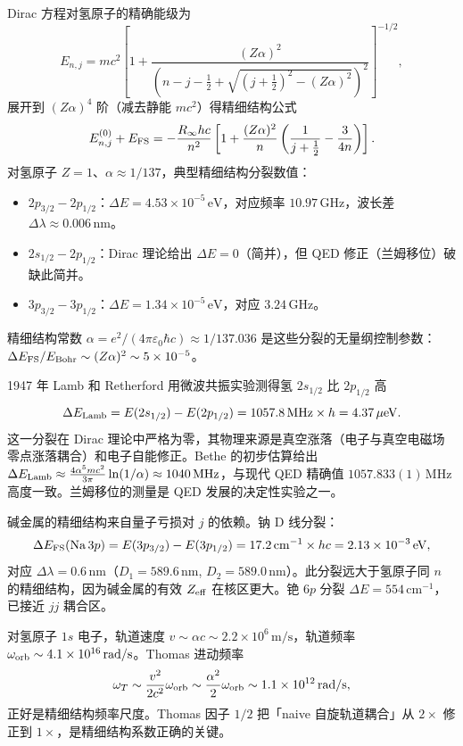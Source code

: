 Dirac 方程对氢原子的精确能级为
\[
 E_{n,j}=mc^2\left[1+\frac{(Z\alpha)^2}{\left(n-j-\frac12+\sqrt{(j+\frac12)^2-(Z\alpha)^2}\right)^2}\right]^{-1/2},
\]
展开到 $(Z\alpha)^4$ 阶（减去静能 $mc^2$）得精细结构公式
\[
 E_{n,j}^{(0)}+E_{\rm FS}
 =-\frac{R_\infty hc}{n^2}\left[1+\frac{(Z\alpha)^2}{n}\left(\frac1{j+\frac12}-\frac{3}{4n}\right)\right].
\]
对氢原子 $Z=1$、$\alpha\approx1/137$，典型精细结构分裂数值：
\begin{itemize}
 \item $2p_{3/2}-2p_{1/2}$：$\Delta E=4.53\times10^{-5}\,\mathrm{eV}$，对应频率 $10.97\,\mathrm{GHz}$，波长差 $\Delta\lambda\approx0.006\,\mathrm{nm}$。
 \item $2s_{1/2}-2p_{1/2}$：Dirac 理论给出 $\Delta E=0$（简并），但 QED 修正（兰姆移位）破缺此简并。
 \item $3p_{3/2}-3p_{1/2}$：$\Delta E=1.34\times10^{-5}\,\mathrm{eV}$，对应 $3.24\,\mathrm{GHz}$。
\end{itemize}
精细结构常数 $\alpha=e^2/(4\pi\varepsilon_0\hbar c)\approx1/137.036$ 是这些分裂的无量纲控制参数：$\Delta E_{\rm FS}/E_{\rm Bohr}\sim(Z\alpha)^2\sim5\times10^{-5}$。

1947 年 Lamb 和 Retherford 用微波共振实验测得氢 $2s_{1/2}$ 比 $2p_{1/2}$ 高
\[
 \Delta E_{\rm Lamb}=E(2s_{1/2})-E(2p_{1/2})=1057.8\,\mathrm{MHz}\times h=4.37\,\mathrm{\mu eV}.
\]
这一分裂在 Dirac 理论中严格为零，其物理来源是真空涨落（电子与真空电磁场零点涨落耦合）和电子自能修正。Bethe 的初步估算给出 $\Delta E_{\rm Lamb}\approx\frac{4\alpha^5mc^2}{3\pi}\ln(1/\alpha)\approx1040\,\mathrm{MHz}$，与现代 QED 精确值 $1057.833(1)\,\mathrm{MHz}$ 高度一致。兰姆移位的测量是 QED 发展的决定性实验之一。

碱金属的精细结构来自量子亏损对 $j$ 的依赖。钠 D 线分裂：
\[
 \Delta E_{\rm FS}(\mathrm{Na}\,3p)=E(3p_{3/2})-E(3p_{1/2})=17.2\,\mathrm{cm^{-1}}\times hc=2.13\times10^{-3}\,\mathrm{eV},
\]
对应 $\Delta\lambda=0.6\,\mathrm{nm}$（$D_1=589.6\,\mathrm{nm}$, $D_2=589.0\,\mathrm{nm}$）。此分裂远大于氢原子同 $n$ 的精细结构，因为碱金属的有效 $Z_{\rm eff}$ 在核区更大。铯 $6p$ 分裂 $\Delta E=554\,\mathrm{cm^{-1}}$，已接近 $jj$ 耦合区。

对氢原子 $1s$ 电子，轨道速度 $v\sim\alpha c\sim2.2\times10^6\,\mathrm{m/s}$，轨道频率 $\omega_{\rm orb}\sim4.1\times10^{16}\,\mathrm{rad/s}$。Thomas 进动频率
\[
 \omega_T\sim\frac{v^2}{2c^2}\omega_{\rm orb}\sim\frac{\alpha^2}{2}\omega_{\rm orb}\sim1.1\times10^{12}\,\mathrm{rad/s},
\]
正好是精细结构频率尺度。Thomas 因子 $1/2$ 把「naive 自旋轨道耦合」从 $2\times$ 修正到 $1\times$，是精细结构系数正确的关键。

